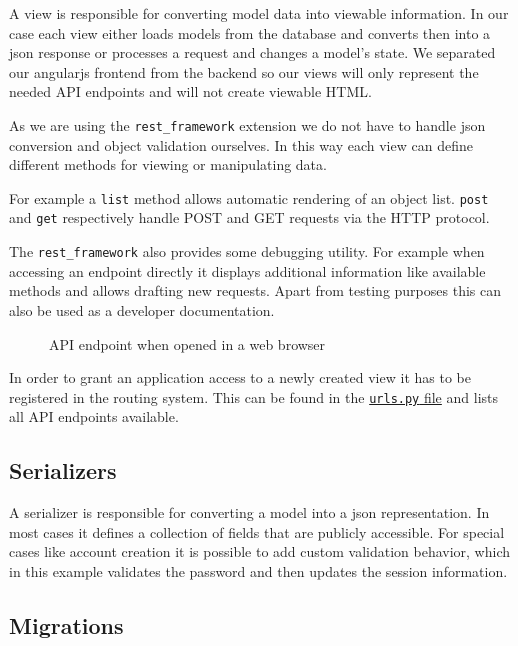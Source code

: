 A view is responsible for converting model data into viewable
information. In our case each view either loads models from the database
and converts then into a json response or processes a request and
changes a model's state. We separated our angularjs frontend from the
backend so our views will only represent the needed API endpoints and
will not create viewable HTML.

As we are using the \texttt{rest\_framework} extension we do not have to
handle json conversion and object validation ourselves. In this way each
view can define different methods for viewing or manipulating data.

For example a \texttt{list} method allows automatic rendering of an
object list. \texttt{post} and \texttt{get} respectively handle POST and
GET requests via the HTTP protocol.

The \texttt{rest\_framework} also provides some debugging utility. For
example when accessing an endpoint directly it displays additional
information like available methods and allows drafting new requests.
Apart from testing purposes this can also be used as a developer
documentation.

\begin{figure}[htbp]
\centering
{}
\caption{API endpoint when opened in a web browser}
\end{figure}

In order to grant an application access to a newly created view it has
to be registered in the routing system. This can be found in the
\href{../../server/server/urls.py}{\texttt{urls.py} file} and lists all
API endpoints available.

\subsection{Serializers}\label{serializers}

A serializer is responsible for converting a model into a json
representation. In most cases it defines a collection of fields that are
publicly accessible. For special cases like account creation it is
possible to add custom validation behavior, which in this example
validates the password and then updates the session information.

\subsection{Migrations}\label{migrations}

